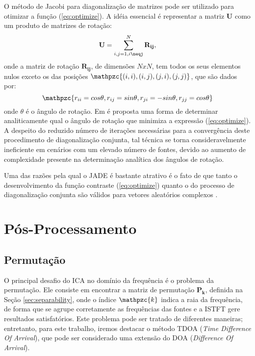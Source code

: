     O método de Jacobi para diagonalização de matrizes pode ser utilizado para otimizar a função (\ref{eq:optimize}). A idéia essencial é representar a matriz $\mathbf{U}$ como um produto de matrizes de rotação:
    \begin{equation}
        \mathbf{U} = \sum_{i,j=1,i\neqj}^N \mathbf{R_{ij}},
    \end{equation}
    onde a matriz de rotação $\mathbf{R_{ij}}$, de dimensões $NxN$, tem todos os seus elementos nulos exceto os das posições $\mathpzc{(i,i), (i,j), (j,i), (j,j)}$, que são dados por:
    \begin{equation}
        \mathpzc{r_{ii} = cos \theta, r_{ij} = sin \theta, r_{ji} = -sin \theta, r_{jj} = cos \theta}
    \end{equation}
    onde $\theta$ é o ângulo de rotação. Em \cite{JADE} é proposta uma forma de determinar analiticamente qual o ângulo de rotação que minimiza a expressão (\ref{eq:optimize}). A despeito do reduzido número de iterações necessárias para a convergência deste procedimento de diagonalização conjunta, tal técnica se torna consideravelmente ineficiente em cenários com um elevado número de fontes, devido ao aumento de complexidade presente na determinação analítica dos ângulos de rotação.
    
    Uma das razões pela qual o JADE é bastante atrativo é o fato de que tanto o desenvolvimento da função contraste (\ref{eq:optimize}) quanto o do processo de diagonalização conjunta são válidos para vetores aleatórios complexos \cite{JADE}. 

\section{Pós-Processamento}

    \subsection{Permutação} \label{sec:tdoa}
    O principal desafio do ICA no domínio da frequência é o problema da permutação. Ele consiste em encontrar a matriz de permutação $\mathbf{P_k}$, definida na Seção \ref{sec:separability}, onde o índice $\mathpzc{k}$ indica a raia da frequência, de forma que se agrupe corretamente as frequências das fontes e a ISTFT gere resultados satisfatórios.
    Este problema pode ser tratado de diferentes maneiras; entretanto, para este trabalho, iremos destacar o método TDOA (\textit{Time Difference Of Arrival}), que pode ser considerado uma extensão do DOA (\textit{Difference Of Arrival}).
    
